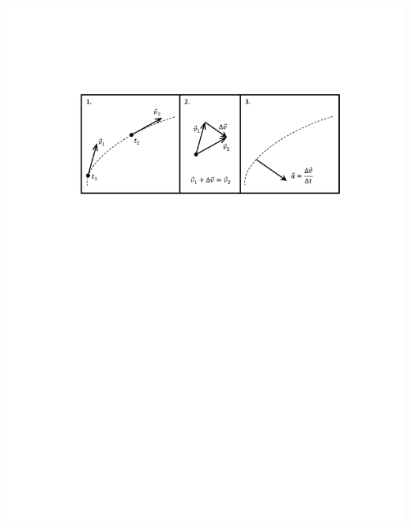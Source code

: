 \vspace{0.3cm}
{\par\centering \includegraphics{circ_motion/circ_motion_fig1_new.pdf} \par}
\vspace{0.3cm}

